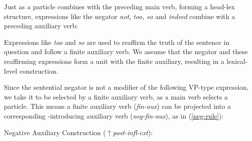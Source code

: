 \documentclass[output=paper]{langsci/langscibook}
\begin{document}
{\begin{exe}
\begin{xlist}
\begin{exe}
\begin{xlist}
\ea
{}
\z

%
Just as a particle combines with the preceding main verb, forming a
head-lex structure,  expressions like
the negator \emph{not}, \emph{too, so} and \emph{indeed} combine with a
preceding auxiliary verb:

\eal
{}
\zl
%
Expressions like \emph{too} and \emph{so} are used to
reaffirm the truth of the sentence in question and
follow a finite auxiliary verb.  We assume that the negator and these reaffirming expressions form
a unit with the finite auxiliary, resulting in a lexical-level construction.

Since the sentential negator is not a modifier of
the following VP-type expression,
we take it to be selected by a finite auxiliary verb, as a main verb selects a particle.
This means a finite auxiliary verb ({\it fin-aux}) can be projected into a corresponding
\NEG-introducing auxiliary verb ({\it neg-fin-aux}), as in (\ref{neg-rule}):
%

\ea\label{neg-rule} Negative Auxiliary Construction ($\uparrow${\it post-infl-cxt}): \\ \small{}


\end{xlist}
\end{exe}
\end{xlist}
\end{exe}}
\end{document}
